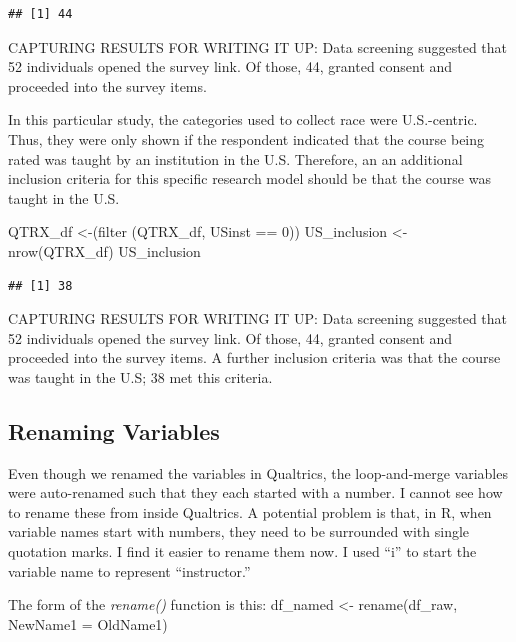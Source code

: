 \documentclass[
  english,
]{book}
\newenvironment{Shaded}{\begin{snugshade}}{\end{snugshade}}
\newcommand{\DecValTok}[1]{\textcolor[rgb]{0.00,0.00,0.81}{#1}}
\newcommand{\FunctionTok}[1]{\textcolor[rgb]{0.00,0.00,0.00}{#1}}
\newcommand{\NormalTok}[1]{#1}
\newcommand{\OtherTok}[1]{\textcolor[rgb]{0.56,0.35,0.01}{#1}}
\newcommand{\SpecialCharTok}[1]{\textcolor[rgb]{0.00,0.00,0.00}{#1}}
\begin{document}
\begin{verbatim}
## [1] 44
\end{verbatim}

CAPTURING RESULTS FOR WRITING IT UP: Data screening suggested that 52 individuals opened the survey link. Of those, 44, granted consent and proceeded into the survey items.

In this particular study, the categories used to collect race were U.S.-centric. Thus, they were only shown if the respondent indicated that the course being rated was taught by an institution in the U.S. Therefore, an an additional inclusion criteria for this specific research model should be that the course was taught in the U.S.

\begin{Shaded}
\begin{Highlighting}[]
\NormalTok{QTRX\_df }\OtherTok{\textless{}{-}}\NormalTok{(}\FunctionTok{filter}\NormalTok{ (QTRX\_df, USinst }\SpecialCharTok{==} \DecValTok{0}\NormalTok{))}
\NormalTok{US\_inclusion }\OtherTok{\textless{}{-}} \FunctionTok{nrow}\NormalTok{(QTRX\_df)}
\NormalTok{US\_inclusion}
\end{Highlighting}
\end{Shaded}

\begin{verbatim}
## [1] 38
\end{verbatim}

CAPTURING RESULTS FOR WRITING IT UP: Data screening suggested that 52 individuals opened the survey link. Of those, 44, granted consent and proceeded into the survey items. A further inclusion criteria was that the course was taught in the U.S; 38 met this criteria.

\hypertarget{renaming-variables}{%
\subsection{Renaming Variables}\label{renaming-variables}}

Even though we renamed the variables in Qualtrics, the loop-and-merge variables were auto-renamed such that they each started with a number. I cannot see how to rename these from inside Qualtrics. A potential problem is that, in R, when variable names start with numbers, they need to be surrounded with single quotation marks. I find it easier to rename them now. I used ``i'' to start the variable name to represent ``instructor.''

The form of the \emph{rename()} function is this:
df\_named \textless- rename(df\_raw, NewName1 = OldName1)
\end{document}

